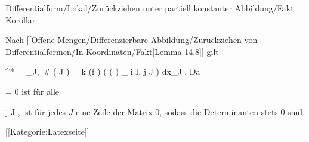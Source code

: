 {Differentialform/Lokal/Zurückziehen unter partiell konstanter Abbildung/Fakt}
{Korollar}
{}
{

\faktzusatz {}
\faktzusatz {}

}
{

Nach
[[Offene Mengen/Differenzierbare Abbildung/Zurückziehen von Differentialformen/In Koordinaten/Fakt|Lemma 14.8]]
gilt

\mavergleichskettedisp
{\vergleichskette
{ \varphi^* \omega
}
{ =} { \sum_{J,\, { \# \left(   J  \right) } = k} (f \circ \varphi) \cdot \det  \left(  \left(  {  }  \right) _{ i \in I, j \in J}  \right) dx_J
}
{ } {
}
{ } {
}
{ } {}
}
{}{}{.}
Da

\mavergleichskettedisp
{\vergleichskette
{ {  }
}
{ =} { 0
}
{ } {
}
{ } {
}
{ } {
}
}
{}{}{}
ist für alle

\mavergleichskette
{\vergleichskette
{ j
}
{ \in }{ J
}
{  }{
}
{    }{
}
{   }{
}
}
{}{}{,}
ist für jedes $J$ eine Zeile der Matrix $0$, sodass die Determinanten stets $0$ sind.

}

 [[Kategorie:Latexseite]]
